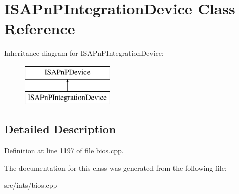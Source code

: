 \hypertarget{classISAPnPIntegrationDevice}{\section{I\-S\-A\-Pn\-P\-Integration\-Device Class Reference}
\label{classISAPnPIntegrationDevice}
}
Inheritance diagram for I\-S\-A\-Pn\-P\-Integration\-Device\-:\begin{figure}[H]
\begin{center}
\leavevmode
\includegraphics[height=2.000000cm]{classISAPnPIntegrationDevice}
\end{center}
\end{figure}


\subsection{Detailed Description}


Definition at line 1197 of file bios.\-cpp.



The documentation for this class was generated from the following file\-:\begin{DoxyCompactItemize}
\item 
src/ints/bios.\-cpp\end{DoxyCompactItemize}
